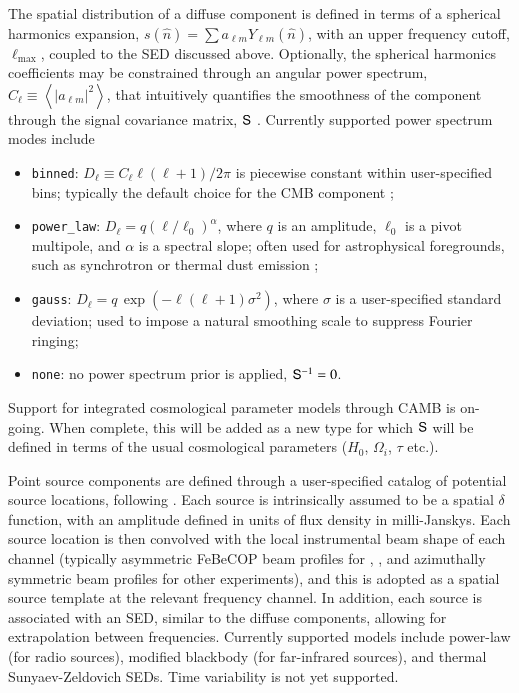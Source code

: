 \documentclass[twocolumn]{aa}
\renewcommand{\S}[0]{\tens{S}}
\begin{document}
The spatial distribution of a diffuse component is defined in terms of a
spherical harmonics expansion, $s(\hat{n}) = \sum a_{\ell m} Y_{\ell
  m}(\hat{n})$, with an upper frequency cutoff, $\ell_{\mathrm{max}}$,
coupled to the SED discussed above. Optionally, the spherical
harmonics coefficients may be constrained through an angular power
spectrum, $C_{\ell}\equiv\left<|a_{\ell m}|^2\right>$, that
intuitively quantifies the smoothness of the component through the
signal covariance matrix, $\S$ \citep{BP13}. Currently supported power
spectrum modes include
\begin{itemize}
\item \texttt{binned}: $D_{\ell}\equiv C_{\ell}\ell(\ell+1)/2\pi$
is piecewise constant within user-specified bins; typically the
default choice for the CMB component \citep{BP11,BP12};
\item \texttt{power\_law}: $D_{\ell}=q(\ell/\ell_0)^{\alpha}$, where
  $q$ is an amplitude, $\ell_0$ is a pivot multipole, and $\alpha$ is
  a spectral slope; often used for astrophysical foregrounds, such as
  synchrotron or thermal dust emission \citep[e.g,][]{planck2014-a12};
\item \texttt{gauss}: $D_{\ell} = q\,\exp(-\ell(\ell+1)\sigma^2)$,
  where $\sigma$ is a user-specified standard deviation; used to
  impose a natural smoothing scale to suppress Fourier ringing;
\item \texttt{none}: no power spectrum prior is applied, $\S^{-1}=0$.
\end{itemize}
Support for integrated cosmological parameter models through CAMB
\citep{Lewis:1999bs} is on-going. When complete, this will be added as
a new type for which $\S$ will be defined in terms of the usual
cosmological parameters ($H_0$, $\Omega_i$, $\tau$ etc.).

Point source components are defined through a user-specified catalog
of potential source locations, following \citet{planck2016-l04}. Each
source is intrinsically assumed to be a spatial $\delta$ function,
with an amplitude defined in units of flux density in
milli-Janskys. Each source location is then convolved with the local
instrumental beam shape of each channel (typically asymmetric FeBeCOP
beam profiles for \Planck, \citealp{mitra2010}, and azimuthally
symmetric beam profiles for other experiments), and this is adopted as
a spatial source template at the relevant frequency channel. In
addition, each source is associated with an SED, similar to the
diffuse components, allowing for extrapolation between
frequencies. Currently supported models include power-law (for radio
sources), modified blackbody (for far-infrared sources), and thermal
Sunyaev-Zeldovich SEDs. Time variability is not yet supported.
\end{document}
